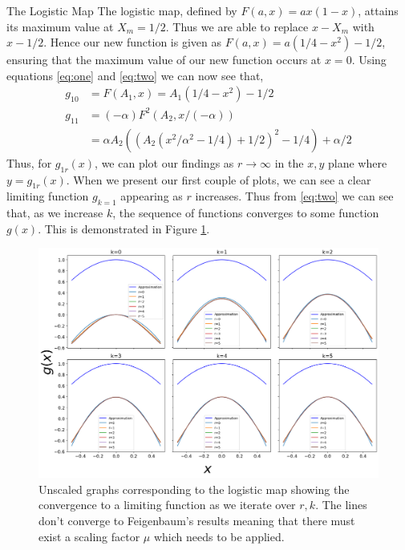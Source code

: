 \begin{exmp} The Logistic Map
	The logistic map, defined by $F(a,x)=ax(1-x)$, attains its maximum value at $X_m =1/2$.
	Thus we are able to replace $x-X_m$ with $x-1/2$. Hence our new function is given as $F(a,x)=a(1/4-x^2)-1/2$, ensuring that the maximum value of our new function occurs at $x=0$. Using equations \eqref{eq:one} and \eqref{eq:two} we can now see that,
    \begin{align}
        g_{10}&=F(A_1,x)=A_1(1/4-x^2)-1/2 \nonumber \\
        g_{11}&=(-\alpha)F^2(A_2,x/(-\alpha)) \nonumber \\
        &= \alpha A_2 \left(\left(A_2 \left(x^{2}/\alpha^2 - 1/4\right) + 1/2\right)^{2} - 1/4\right) + \alpha/2
    \end{align}
    Thus, for $g_{1r}(x)$, we can plot our findings as $r \to \infty$ in the $x, y$ plane where $y=g_{1r}(x)$. 
	When we present our first couple of plots, we can see a clear limiting function $g_{k=1}$ appearing as $r$ increases. Thus from \eqref{eq:two} we can see that, as we increase $k$, the sequence of functions converges to some function $g(x)$. 
	This is demonstrated in Figure \ref{fig:unscaled}.
	\begin{figure}
    \centering    \includegraphics[width=1\textwidth]{Feigenbaum Approx Graphs/feignabum.png}
    \caption{Unscaled graphs corresponding to the logistic map showing the convergence to a limiting function as we iterate over $r,k$. The lines don't converge to Feigenbaum's results meaning that there must exist a scaling factor $\mu$ which needs to be applied.}
    \label{fig:unscaled}
\end{figure}
    


\end{exmp}
